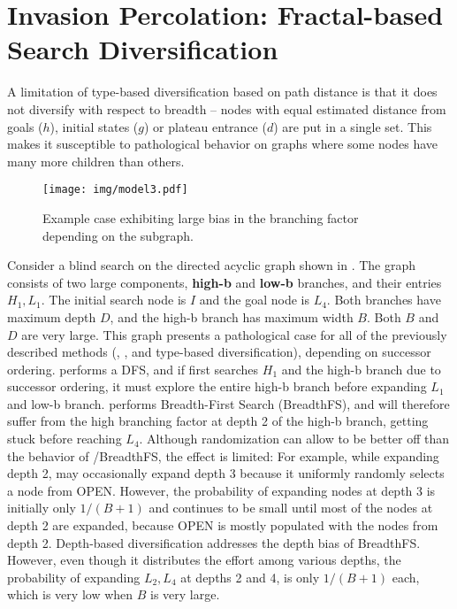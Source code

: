 
\chapter[Invasion Percolation]{Invasion Percolation: Fractal-based Search Diversification}

\label{chap:ip}

A limitation of  type-based diversification based on path distance %
is that it does not diversify with respect to breadth -- 
nodes with equal estimated distance from goals ($h$), initial states ($g$) or plateau entrance ($d$) are put in a single set.
This makes it susceptible to pathological behavior on graphs where some nodes have many more children than others.

\begin{figure}[hbt]
 \centering
 \texttt{[image: img/model3.pdf]}
 \caption{Example case exhibiting large bias in the branching factor depending on the subgraph.}
 \label{fig:model}
\end{figure}

Consider a blind search on the directed acyclic graph
shown in .
The graph consists of two large components, \textbf{high-b} and \textbf{low-b} branches, and their entries $H_1,L_1$. The initial search node is $I$ and the goal node is $L_4$.
Both branches have maximum depth $D$, and the high-b branch has maximum width $B$.
Both $B$ and $D$ are very large.
This graph presents a pathological case for all of the previously described methods (\lifo, \fifo, \ro and type-based diversification), depending on successor ordering.
\lifo performs a DFS, and if \lifo first searches $H_1$ and the high-b branch due to successor ordering, it must explore the entire high-b branch before expanding $L_1$ and low-b branch.
\fifo performs Breadth-First Search (BreadthFS), and  will therefore suffer from the  high branching factor at depth 2 of the high-b branch, getting stuck before reaching $L_4$.
Although randomization can allow \ro to be better off than the behavior of \fifo/BreadthFS, the effect is limited:
For example, while expanding depth 2, \ro may occasionally expand depth 3 because it uniformly randomly selects a node from OPEN.
However, the probability of expanding nodes at depth 3 is initially only $1/(B+1)$ and continues to be small until  most of the nodes at depth 2 are expanded, 
because OPEN is mostly populated with the nodes from depth 2.
Depth-based diversification addresses the depth bias of BreadthFS.
However, even though it distributes the effort among various depths,
the probability of expanding $L_2,L_4$ at depths 2 and 4, is only $1/(B+1)$ each, which is very low when $B$ is very large.

